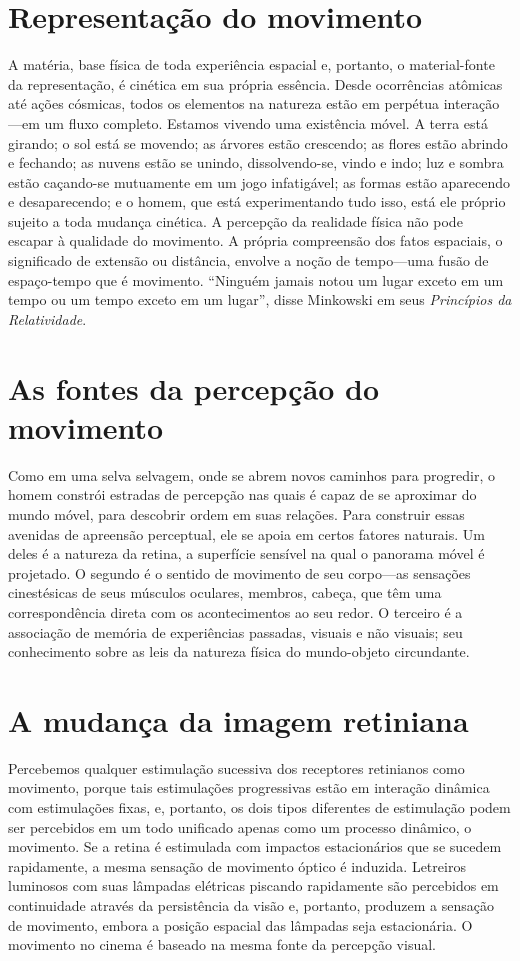 \documentclass[a4paper]{article}
\begin{document}
\section*{Representação do movimento}
A matéria, base física de toda experiência espacial e, portanto, o material-fonte da representação, é cinética em sua própria essência. Desde ocorrências atômicas até ações cósmicas, todos os elementos na natureza estão em perpétua interação---em um fluxo completo. Estamos vivendo uma existência móvel. A terra está girando; o sol está se movendo; as árvores estão crescendo; as flores estão abrindo e fechando; as nuvens estão se unindo, dissolvendo-se, vindo e indo; luz e sombra estão caçando-se mutuamente em um jogo infatigável; as formas estão aparecendo e desaparecendo; e o homem, que está experimentando tudo isso, está ele próprio sujeito a toda mudança cinética. A percepção da realidade física não pode escapar à qualidade do movimento. A própria compreensão dos fatos espaciais, o significado de extensão ou distância, envolve a noção de tempo---uma fusão de espaço-tempo que é movimento. ``Ninguém jamais notou um lugar exceto em um tempo ou um tempo exceto em um lugar'', disse Minkowski em seus \textit{Princípios da Relatividade}.

\section*{As fontes da percepção do movimento}
Como em uma selva selvagem, onde se abrem novos caminhos para progredir, o homem constrói estradas de percepção nas quais é capaz de se aproximar do mundo móvel, para descobrir ordem em suas relações. Para construir essas avenidas de apreensão perceptual, ele se apoia em certos fatores naturais. Um deles é a natureza da retina, a superfície sensível na qual o panorama móvel é projetado. O segundo é o sentido de movimento de seu corpo---as sensações cinestésicas de seus músculos oculares, membros, cabeça, que têm uma correspondência direta com os acontecimentos ao seu redor. O terceiro é a associação de memória de experiências passadas, visuais e não visuais; seu conhecimento sobre as leis da natureza física do mundo-objeto circundante.

\section*{A mudança da imagem retiniana}
Percebemos qualquer estimulação sucessiva dos receptores retinianos como movimento, porque tais estimulações progressivas estão em interação dinâmica com estimulações fixas, e, portanto, os dois tipos diferentes de estimulação podem ser percebidos em um todo unificado apenas como um processo dinâmico, o movimento. Se a retina é estimulada com impactos estacionários que se sucedem rapidamente, a mesma sensação de movimento óptico é induzida. Letreiros luminosos com suas lâmpadas elétricas piscando rapidamente são percebidos em continuidade através da persistência da visão e, portanto, produzem a sensação de movimento, embora a posição espacial das lâmpadas seja estacionária. O movimento no cinema é baseado na mesma fonte da percepção visual.
\end{document}
